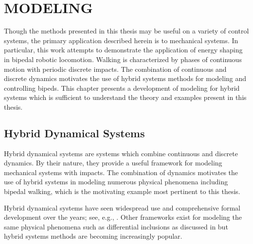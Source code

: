 \chapter{\uppercase{Modeling}} \label{ch:modeling}

Though the methods presented in this thesis may be useful on a variety of
control systems, the primary application described herein is to mechanical
systems.
%
In particular, this work attempts to demonstrate the application of energy
shaping in bipedal robotic locomotion.
%
Walking is characterized by phases of continuous motion with periodic discrete
impacts.
%
The combination of continuous and discrete dynamics motivates the use of hybrid
systems methods for modeling and controlling bipeds.
%
This chapter presents a development of modeling for hybrid systems which is
sufficient to understand the theory and examples present in this thesis.
%

\section{Hybrid Dynamical Systems}

Hybrid dynamical systems are systems which combine continuous and discrete
dynamics.
%
By their nature, they provide a useful framework for modeling mechanical systems
with impacts.
%
The combination of dynamics motivates the use of hybrid systems in modeling
numerous physical phenomena including bipedal walking, which is the motivating
example most pertinent to this thesis.
%

Hybrid dynamical systems have seen widespread use and comprehensive formal
development over the years;
%
see, e.g.,
\cite{Branicky1998,Goebel2009,Grizzle2014,Schaft2000,Westervelt2007}.
%
Other frameworks exist for modeling the same physical phenomena such as
differential inclusions as discussed in \cite{Filippov1988} but hybrid systems
methods are becoming increasingly popular.

